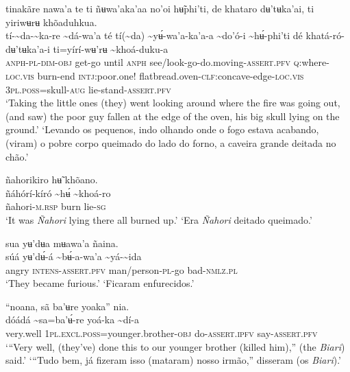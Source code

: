 \documentclass[output=paper,
modfonts,nonflat
]{langsci/langscibook}
\begin{document}
\largerpage[2]
\ea tinakãre nawa'a te ti ñʉwa'aka'aa no'oi hʉ̃phi'ti, de khataro dʉ'tʉka'ai, ti yiriwʉrʉ khõaduhkua. \\[.3em]
\gll tí-{\textasciitilde}da-{\textasciitilde}ka-re	{\textasciitilde}dá-wa'a	té	tí({\textasciitilde}da)	{\textasciitilde}yʉ́-wa'a-ka'a-a	{\textasciitilde}do'ó-i	{\textasciitilde}hʉ́-phi'ti dé	khatá-ró-dʉ'tʉka'a-i	ti=yírí-wʉ'rʉ	{\textasciitilde}khoá-duku{\footnotemark}-a\\
     \textsc{anph-pl-dim-obj}	get-go	until	\textsc{anph}	see/look-go-do.moving-\textsc{assert.pfv}	\textsc{q:}where-\textsc{loc.vis}	burn-end \textsc{intj:}poor.one!	flatbread.oven-\textsc{clf:}concave-edge-\textsc{loc.vis} 	3\textsc{pl.poss}=skull-\textsc{aug}	lie-stand-\textsc{assert.pfv}\\
\glt ‘Taking the little ones (they) went looking around where the fire was going out, (and saw) the poor guy fallen at the edge of the oven, his big skull lying on the ground.’
\newpage
\glt ‘Levando os pequenos, indo olhando onde o fogo estava acabando, (viram) o pobre corpo queimado do lado do forno, a caveira grande deitada no chão.’
\z 

\ea ñahorikiro hʉ̃ khõano.  \\[.3em]
\gll ñáhórí-kíró	{\textasciitilde}hʉ́	{\textasciitilde}khoá-ro \\
     ñahori-\textsc{m.rsp}	burn	lie\textsc{-sg} \\
\glt ‘It was \textit{Ñahori} lying there all burned up.’ 
\glt ‘Era \textit{Ñahori} deitado queimado.’ 
\z 

\ea sua yʉ'dʉa mʉawa'a ñaina. \\[.3em]
\gll súá	yʉ'dʉ́-á	{\textasciitilde}bʉ́-a-wa'a	{\textasciitilde}yá-{\textasciitilde}ida \\
     angry	\textsc{intens-assert.pfv}	man/person-\textsc{pl}-go	bad-\textsc{nmlz.pl}\\
\glt ‘They became furious.’
\glt ‘Ficaram enfurecidos.’
\z 

\ea “noana, sã ba'ʉre yoaka” nia.  \\[.3em]
\gll {\textasciitilde}dóádá	{\textasciitilde}sa=ba'ʉ́-re	yoá-ka{\footnotemark}	{\textasciitilde}dí-a \\
     very.well	1\textsc{pl.excl.poss}=younger.brother\textsc{-obj}	do-\textsc{assert.ipfv}	say-\textsc{assert.pfv} \\
\glt ‘“Very well, (they've) done this to our younger brother (killed him),” (the \textit{Biari}) said.’
\glt ‘“Tudo bem, já fizeram isso (mataram) nosso irmão,” disseram (os \textit{Biari}).’
\z 
\end{document}
